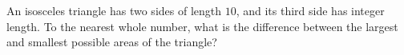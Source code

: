 An isosceles triangle has two sides of length $10$, and its third side has integer length. To the nearest whole number, what is the difference between the largest and smallest possible areas of the triangle?
